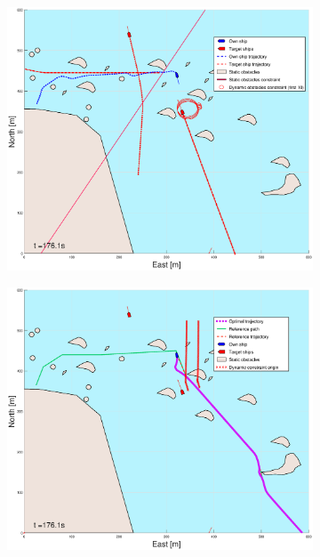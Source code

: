 \begin{figure}[ht]\ContinuedFloat
    \begin{subfigure}[b]{0.49\textwidth}
        \centering
        \includegraphics[width=\textwidth]{Images/Figures/skjergard_m_trafikk_NEW/_Simple_0fig1_time=176}
    \end{subfigure}
    \hfill
    \begin{subfigure}[b]{0.499\textwidth}
        \centering
        \includegraphics[width=\textwidth]{Images/Figures/skjergard_m_trafikk_NEW/_Simple_0fig999_time=176}

\end{subfigure}
\end{figure}
